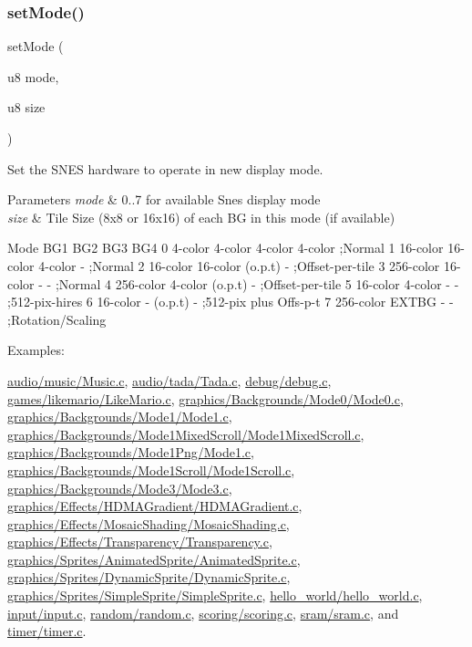 \subsubsection{\texorpdfstring{set\+Mode()}{setMode()}}
{\footnotesize\ttfamily set\+Mode (\begin{DoxyParamCaption}\item[{u8}]{mode,  }\item[{u8}]{size }\end{DoxyParamCaption})}



Set the S\+N\+ES hardware to operate in new display mode. 


\begin{DoxyParams}{Parameters}
{\em mode} & 0..7 for available Snes display mode \\
\hline
{\em size} & Tile Size (8x8 or 16x16) of each BG in this mode (if available)\\
\hline
\end{DoxyParams}
Mode B\+G1 B\+G2 B\+G3 B\+G4 0 4-\/color 4-\/color 4-\/color 4-\/color ;Normal 1 16-\/color 16-\/color 4-\/color -\/ ;Normal 2 16-\/color 16-\/color (o.\+p.\+t) -\/ ;Offset-\/per-\/tile 3 256-\/color 16-\/color -\/ -\/ ;Normal 4 256-\/color 4-\/color (o.\+p.\+t) -\/ ;Offset-\/per-\/tile 5 16-\/color 4-\/color -\/ -\/ ;512-\/pix-\/hires 6 16-\/color -\/ (o.\+p.\+t) -\/ ;512-\/pix plus Offs-\/p-\/t 7 256-\/color E\+X\+T\+BG -\/ -\/ ;Rotation/\+Scaling \begin{Desc}
\item[Examples\+: ]\par
\hyperlink{a00485}{audio/music/\+Music.\+c}, \hyperlink{a00487}{audio/tada/\+Tada.\+c}, \hyperlink{a00489}{debug/debug.\+c}, \hyperlink{a00483}{games/likemario/\+Like\+Mario.\+c}, \hyperlink{a00453}{graphics/\+Backgrounds/\+Mode0/\+Mode0.\+c}, \hyperlink{a00455}{graphics/\+Backgrounds/\+Mode1/\+Mode1.\+c}, \hyperlink{a00461}{graphics/\+Backgrounds/\+Mode1\+Mixed\+Scroll/\+Mode1\+Mixed\+Scroll.\+c}, \hyperlink{a00457}{graphics/\+Backgrounds/\+Mode1\+Png/\+Mode1.\+c}, \hyperlink{a00459}{graphics/\+Backgrounds/\+Mode1\+Scroll/\+Mode1\+Scroll.\+c}, \hyperlink{a00463}{graphics/\+Backgrounds/\+Mode3/\+Mode3.\+c}, \hyperlink{a00467}{graphics/\+Effects/\+H\+D\+M\+A\+Gradient/\+H\+D\+M\+A\+Gradient.\+c}, \hyperlink{a00469}{graphics/\+Effects/\+Mosaic\+Shading/\+Mosaic\+Shading.\+c}, \hyperlink{a00471}{graphics/\+Effects/\+Transparency/\+Transparency.\+c}, \hyperlink{a00475}{graphics/\+Sprites/\+Animated\+Sprite/\+Animated\+Sprite.\+c}, \hyperlink{a00477}{graphics/\+Sprites/\+Dynamic\+Sprite/\+Dynamic\+Sprite.\+c}, \hyperlink{a00473}{graphics/\+Sprites/\+Simple\+Sprite/\+Simple\+Sprite.\+c}, \hyperlink{a00451}{hello\+\_\+world/hello\+\_\+world.\+c}, \hyperlink{a00479}{input/input.\+c}, \hyperlink{a00491}{random/random.\+c}, \hyperlink{a00495}{scoring/scoring.\+c}, \hyperlink{a00493}{sram/sram.\+c}, and \hyperlink{a00481}{timer/timer.\+c}.\end{Desc}
\mbox{\label{a00416_af7e722fd2eba5682bc0eafa9d5a9c51a}} 
